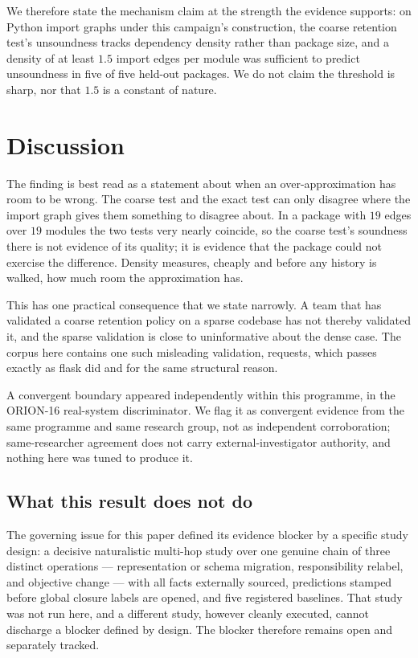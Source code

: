 \documentclass[11pt]{article}
\begin{document}
We therefore state the mechanism claim at the strength the evidence supports: on Python import graphs under this campaign's construction, the coarse retention test's unsoundness tracks dependency density rather than package size, and a density of at least $1.5$ import edges per module was sufficient to predict unsoundness in five of five held-out packages. We do not claim the threshold is sharp, nor that $1.5$ is a constant of nature.

\section{Discussion}
The finding is best read as a statement about when an over-approximation has room to be wrong. The coarse test and the exact test can only disagree where the import graph gives them something to disagree about. In a package with $19$ edges over $19$ modules the two tests very nearly coincide, so the coarse test's soundness there is not evidence of its quality; it is evidence that the package could not exercise the difference. Density measures, cheaply and before any history is walked, how much room the approximation has.

This has one practical consequence that we state narrowly. A team that has validated a coarse retention policy on a sparse codebase has not thereby validated it, and the sparse validation is close to uninformative about the dense case. The corpus here contains one such misleading validation, requests, which passes exactly as flask did and for the same structural reason.

A convergent boundary appeared independently within this programme, in the ORION-16 real-system discriminator. We flag it as convergent evidence from the same programme and same research group, not as independent corroboration; same-researcher agreement does not carry external-investigator authority, and nothing here was tuned to produce it.

\subsection{What this result does not do}
The governing issue for this paper defined its evidence blocker by a specific study design: a decisive naturalistic multi-hop study over one genuine chain of three distinct operations --- representation or schema migration, responsibility relabel, and objective change --- with all facts externally sourced, predictions stamped before global closure labels are opened, and five registered baselines. That study was not run here, and a different study, however cleanly executed, cannot discharge a blocker defined by design. The blocker therefore remains open and separately tracked.
\end{document}
